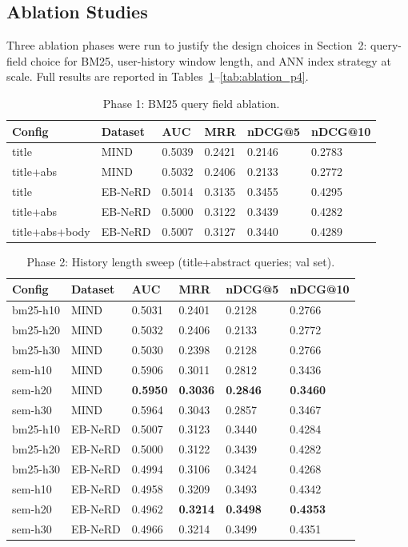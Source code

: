 \documentclass[11pt,a4paper]{article}
\begin{document}
\subsection{Ablation Studies}
Three ablation phases were run to justify the design choices in Section~2: query-field
choice for BM25, user-history window length, and ANN index strategy at scale. Full
results are reported in Tables~\ref{tab:ablation_p1}--\ref{tab:ablation_p4}.

\begin{table}[h!]
  \centering
  \caption{Phase 1: BM25 query field ablation.}
  \label{tab:ablation_p1}
  \small
  \begin{tabularx}{\linewidth}{l l X X X X}
    \toprule
    Config & Dataset & AUC & MRR & nDCG@5 & nDCG@10 \\
    \midrule
    title & MIND & 0.5039 & 0.2421 & 0.2146 & 0.2783 \\
    title+abs & MIND & 0.5032 & 0.2406 & 0.2133 & 0.2772 \\
    \midrule
    title & EB-NeRD & 0.5014 & 0.3135 & 0.3455 & 0.4295 \\
    title+abs & EB-NeRD & 0.5000 & 0.3122 & 0.3439 & 0.4282 \\
    title+abs+body & EB-NeRD & 0.5007 & 0.3127 & 0.3440 & 0.4289 \\
    \bottomrule
  \end{tabularx}
\end{table}

\begin{table}[h!]
  \centering
  \caption{Phase 2: History length sweep (title+abstract queries; val set).}
  \label{tab:ablation_p2}
  \small
  \setlength{\tabcolsep}{3pt}
  \begin{tabularx}{\linewidth}{l l X X X X}
    \toprule
    Config & Dataset & AUC & MRR & nDCG@5 & nDCG@10 \\
    \midrule
    bm25-h10 & MIND & 0.5031 & 0.2401 & 0.2128 & 0.2766 \\
    bm25-h20 & MIND & 0.5032 & 0.2406 & 0.2133 & 0.2772 \\
    bm25-h30 & MIND & 0.5030 & 0.2398 & 0.2128 & 0.2766 \\
    sem-h10 & MIND & 0.5906 & 0.3011 & 0.2812 & 0.3436 \\
    sem-h20 & MIND & \textbf{0.5950} & \textbf{0.3036} & \textbf{0.2846} & \textbf{0.3460} \\
    sem-h30 & MIND & 0.5964 & 0.3043 & 0.2857 & 0.3467 \\
    \midrule
    bm25-h10 & EB-NeRD & 0.5007 & 0.3123 & 0.3440 & 0.4284 \\
    bm25-h20 & EB-NeRD & 0.5000 & 0.3122 & 0.3439 & 0.4282 \\
    bm25-h30 & EB-NeRD & 0.4994 & 0.3106 & 0.3424 & 0.4268 \\
    sem-h10 & EB-NeRD & 0.4958 & 0.3209 & 0.3493 & 0.4342 \\
    sem-h20 & EB-NeRD & 0.4962 & \textbf{0.3214} & \textbf{0.3498} & \textbf{0.4353} \\
    sem-h30 & EB-NeRD & 0.4966 & 0.3214 & 0.3499 & 0.4351 \\
    \bottomrule
  \end{tabularx}
\end{table}
\end{document}
